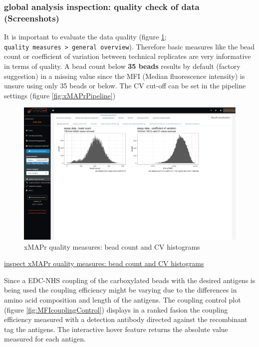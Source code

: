 \documentclass[
]{book}
\begin{document}
\subsubsection{global analysis inspection: quality check of data (Screenshots)}\label{global-analysis-inspection-quality-check-of-data-screenshots}

It is important to evaluate the data quality (figure \ref{fig:beadCountCVhist}; \texttt{quality\ measures\ \textgreater{}\ general\ overview}). Therefore basic measures like the bead count or coefficient of variation between technical replicates are very informative in terms of quality.
A bead count below \textbf{35 beads} results by default (factory suggestion) in a missing value since the MFI (Median fluorescence intensity) is unsure using only 35 beads or below.
The CV cut-off can be set in the pipeline settings (figure \ref{fig:xMAPrPipeline})

\begin{figure}
\includegraphics[width=50.47in]{figures/quality_measures__general_overview} \caption{xMAPr quality measures: bead count and CV histograms}\label{fig:beadCountCVhist}
\end{figure}

\href{figures/quality_measures__general_overview.png}{inspect xMAPr quality measures: bead count and CV histograms}

Since a EDC-NHS coupling of the carboxylated beads with the desired antigens is being used the coupling efficiency might be varying due to the differences in amino acid composition and length of the antigens.
The coupling control plot (figure \ref{fig:MFIcouplingControl}) displays in a ranked fasion the coupling efficiency measured with a detection antibody directed against the recombinant tag the antigens. The interactive hover feature returns the absolute value measured for each antigen.
\end{document}
